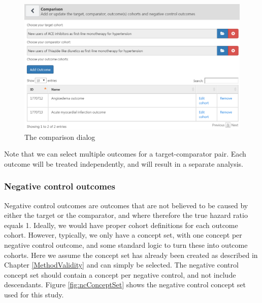 \documentclass[11pt]{book}
\theoremstyle{definition}
\theoremstyle{definition}
\theoremstyle{definition}
\theoremstyle{remark}
\begin{document}
\begin{figure}

{\centering \includegraphics[width=1\linewidth]{images/PopulationLevelEstimation/comparisons} 

}

\caption{The comparison dialog}\label{fig:comparisons}
\end{figure}

Note that we can select multiple outcomes for a target-comparator pair. Each outcome will be treated independently, and will result in a separate analysis.

\hypertarget{negative-control-outcomes}{%
\subsubsection*{Negative control outcomes}\label{negative-control-outcomes}}

Negative control outcomes are outcomes that are not believed to be caused by either the target or the comparator, and where therefore the true hazard ratio equals 1. Ideally, we would have proper cohort definitions for each outcome cohort. However, typically, we only have a concept set, with one concept per negative control outcome, and some standard logic to turn these into outcome cohorts. Here we assume the concept set has already been created as described in Chapter \ref{MethodValidity} and can simply be selected. The negative control concept set should contain a concept per negative control, and not include descendants. Figure \ref{fig:ncConceptSet} shows the negative control concept set used for this study.
\end{document}
